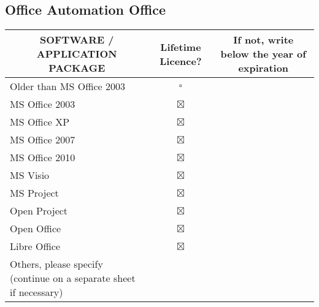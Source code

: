 \documentclass[a4paper,10pt, total={10.95in, 8in}]{article} %
\begin{document}
\subsection{Office Automation Office}
\begin{table}[H]
\renewcommand{\arraystretch}{1.5}
\centering
\begin{adjustbox}{width=6.5in}
\begin{tabular}{|p{6.5cm}|c|l|}
\hline
\multicolumn{1}{|c|}{SOFTWARE / APPLICATION PACKAGE}                             & Lifetime Licence? & \multicolumn{1}{c|}{If not, write below the year of expiration} \\ \hline
Older than MS Office 2003                                          & \Large$\square$       & \multicolumn{1}{c|}{\textbf{}}                                  \\ \hline
MS Office 2003                                                     & \Large$\boxtimes$       & \multicolumn{1}{c|}{\textbf{}}                                  \\ \hline
MS Office XP                                                       & \Large$\boxtimes$       & \multicolumn{1}{c|}{}                                           \\ \hline
MS Office 2007                                                     & \Large$\boxtimes$       & \multicolumn{1}{c|}{}                                           \\ \hline
MS Office 2010                                                     & \Large$\boxtimes$       &                                                                 \\ \hline
MS Visio                                                           & \Large$\boxtimes$       &                                                                 \\ \hline
MS Project                                                         & \Large$\boxtimes$       &                                                                 \\ \hline
Open Project                                                       & \Large$\boxtimes$       &                                                                 \\ \hline
Open Office                                                        & \Large$\boxtimes$       &                                                                 \\ \hline
Libre Office                                                       & \Large$\boxtimes$       &                                                                 \\ \hline
Others, please specify (continue on a separate sheet if necessary) &       &                                                                 \\ \hline
\end{tabular}
\end{adjustbox}
\end{table}
\end{document}
